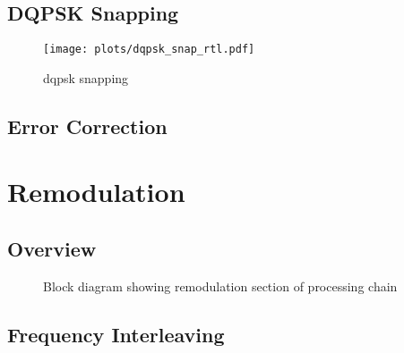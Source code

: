 \documentclass[class=report,11pt,crop=false]{standalone}
\begin{document}
\subsection{DQPSK Snapping \label{subsect:dab-proc_dqpsk-snap}}

\begin{figure}[htbp]
  \centering
  \captionsetup{type=figure}
  \texttt{[image: plots/dqpsk\_snap\_rtl.pdf]}
  \caption{}
  \label{fig:dqpsk_snap_rtl}
\end{figure}

\begin{figure}[htbp]
  \centering
  \captionsetup{type=figure}
  \def\svgwidth{\linewidth}
  { %
      }
  \caption{}
  \label{fig:dqpsk_snap_rtl-alt}
\end{figure}

\begin{figure}[htbp]
  \centering
  \captionsetup{type=figure}
  \def\svgwidth{\linewidth}
  { %
      }
  \caption{\gls{dqpsk} snapping}
  \label{fig:dqpsk_snap}
\end{figure}

\subsection{Error Correction \label{subsect:dab-proc_error-correct}}

\section{Remodulation \label{sect:dab-proc_remodulate}}

\subsection{Overview}

\begin{figure}[htbp]
    \centering
    \captionsetup{type=figure}
    \def\svgwidth{\linewidth}
    { %
        }
    \caption{Block diagram showing remodulation section of processing chain}
    \label{fig:BD_Remod_All}
\end{figure}

\subsection{Frequency Interleaving \label{subsect:dab-proc_freq-interleave}}
\end{document}
